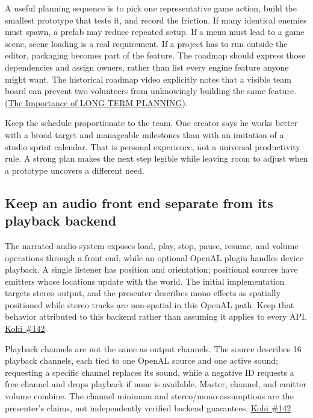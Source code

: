 A useful planning sequence is to pick one representative game action, build the smallest prototype that tests it, and record the friction. If many identical enemies must spawn, a prefab may reduce repeated setup. If a menu must lead to a game scene, scene loading is a real requirement. If a project has to run outside the editor, packaging becomes part of the feature. The roadmap should express those dependencies and assign owners, rather than list every engine feature anyone might want. The historical roadmap video explicitly notes that a visible team board can prevent two volunteers from unknowingly building the same feature. (\href{https://www.youtube.com/watch?v=OsnwKYxPX1A&t=6m35s}{The Importance of LONG-TERM PLANNING}).

Keep the schedule proportionate to the team. One creator says he works better with a broad target and manageable milestones than with an imitation of a studio sprint calendar. That is personal experience, not a universal productivity rule. A strong plan makes the next step legible while leaving room to adjust when a prototype uncovers a different need.

\subsection{Keep an audio front end separate from its playback backend}\label{05-engine-i-ch009-keep-an-audio-front-end-separate-from-its-playback-backend}

\hypertarget{05-engine-i-ch009-keep-an-audio-front-end-separate-from-its-playback-backend}{}

The narrated audio system exposes load, play, stop, pause, resume, and volume operations through a front end, while an optional OpenAL plugin handles device playback. A single listener has position and orientation; positional sources have emitters whose locations update with the world. The initial implementation targets stereo output, and the presenter describes mono effects as spatially positioned while stereo tracks are non-spatial in this OpenAL path. Keep that behavior attributed to this backend rather than assuming it applies to every API. \href{https://www.youtube.com/watch?v=xb23Y9o7tP4}{Kohi \#142}

Playback channels are not the same as output channels. The source describes 16 playback channels, each tied to one OpenAL source and one active sound; requesting a specific channel replaces its sound, while a negative ID requests a free channel and drops playback if none is available. Master, channel, and emitter volume combine. The channel minimum and stereo/mono assumptions are the presenter's claims, not independently verified backend guarantees. \href{https://www.youtube.com/watch?v=xb23Y9o7tP4}{Kohi \#142}


